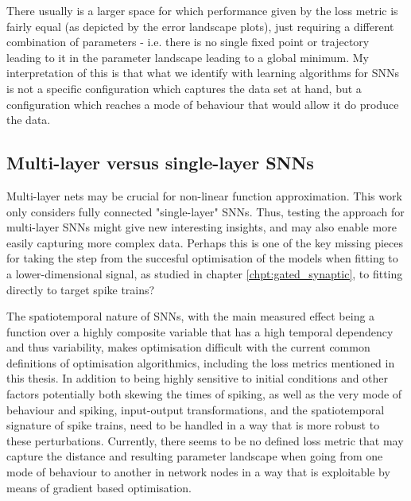 \documentclass[mphil,deptreport,ianc]{infthesis} %
\begin{document}
There usually is a larger space for which performance given by the loss metric is fairly equal (as depicted by the error landscape plots), just requiring a different combination of parameters - i.e. there is no single fixed point or trajectory leading to it in the parameter landscape leading to a global minimum.
My interpretation of this is that what we identify with learning algorithms for SNNs is not a specific configuration which captures the data set at hand, but a configuration which reaches a mode of behaviour that would allow it do produce the data.

\subsection*{Multi-layer versus single-layer SNNs}

Multi-layer nets may be crucial for non-linear function approximation. 
This work only considers fully connected "single-layer" SNNs.
Thus, testing the approach for multi-layer SNNs might give new interesting insights, and may also enable more easily capturing more complex data.
Perhaps this is one of the key missing pieces for taking the step from the succesful optimisation of the models when fitting to a lower-dimensional signal, as studied in chapter \ref{chpt:gated_synaptic}, to fitting directly to target spike trains?





The spatiotemporal nature of SNNs, with the main measured effect being a function over a highly composite variable that has a high temporal dependency and thus variability, makes optimisation difficult with the current common definitions of optimisation algorithmics, including the loss metrics mentioned in this thesis.
In addition to being highly sensitive to initial conditions and other factors potentially both skewing the times of spiking, as well as the very mode of behaviour and spiking, input-output transformations, and the spatiotemporal signature of spike trains, need to be handled in a way that is more robust to these perturbations. 
Currently, there seems to be no defined loss metric that may capture the distance and resulting parameter landscape when going from one mode of behaviour to another in network nodes in a way that is exploitable by means of gradient based optimisation.
\end{document}
